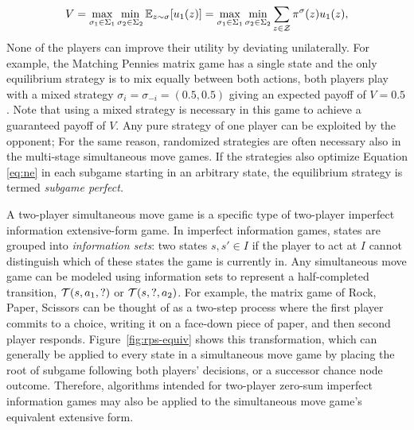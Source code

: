 \begin{equation}\label{eq:ne}
V = \max_{\sigma_1 \in \Sigma_1} \min_{\sigma_2 \in \Sigma_2} \mathbb{E}_{z \sim \sigma}[u_1(z)]
  = \max_{\sigma_1 \in \Sigma_1} \min_{\sigma_2 \in \Sigma_2} \sum_{z \in \mathcal{Z}} \pi^\sigma(z) u_1(z), 
\end{equation}
None of the players can improve their utility by deviating unilaterally. 
For example, the Matching Pennies matrix game has a single state and the only equilibrium strategy is to mix equally between 
both actions, \ie both players play with a mixed strategy $\sigma_i = \sigma_{-i} = (0.5, 0.5)$ giving an expected payoff of 
$V = 0.5$. 
Note that using a mixed strategy is necessary in this game to achieve a guaranteed payoff of $V$.
Any pure strategy of one player can be exploited by the opponent; 
For the same reason, randomized strategies are often necessary also in the multi-stage simultaneous move games. 
If the strategies also optimize Equation \ref{eq:ne} in each subgame starting in an arbitrary state, the equilibrium strategy 
is termed {\it subgame perfect.}

A two-player simultaneous move game is a specific type of two-player imperfect information extensive-form game. 
In imperfect information
games, states are grouped into {\it information sets}: two states $s, s' \in I$ if the player 
to act at $I$ cannot distinguish which of these states the game is currently in. Any simultaneous move game can be modeled 
using information sets to represent a half-completed transition, \ie $\mathcal{T}(s, a_1, ?)$ or $\mathcal{T}(s, ?, a_2)$. 
For example, the matrix game of Rock, Paper, Scissors can be thought of as a two-step process where the first player commits
to a choice, writing it on a face-down piece of paper, and then second player responds. Figure~\ref{fig:rps-equiv} shows this
transformation, which can generally be applied to every state in a simultaneous move game by placing the root of subgame following 
both players' decisions, or a successor chance node outcome. 
Therefore, algorithms intended for two-player zero-sum imperfect information games may also be applied to the 
simultaneous move game's equivalent extensive form. 

